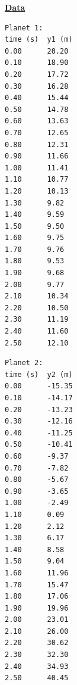 \pagebreak

\underline{\textbf{Data}} \par
\begin{multicols}{2}
\begin{verbatim}
Planet 1:
time (s)  y1 (m)
0.00      20.20
0.10      18.90
0.20      17.72
0.30      16.28
0.40      15.44
0.50      14.78
0.60      13.63
0.70      12.65
0.80      12.31
0.90      11.66
1.00      11.41
1.10      10.77
1.20      10.13
1.30      9.82
1.40      9.59
1.50      9.50
1.60      9.75
1.70      9.76
1.80      9.53
1.90      9.68
2.00      9.77
2.10      10.34
2.20      10.50
2.30      11.19
2.40      11.60
2.50      12.10
\end{verbatim}

\columnbreak

\begin{verbatim}
Planet 2:
time (s)  y2 (m)
0.00      -15.35
0.10      -14.17
0.20      -13.23
0.30      -12.16
0.40      -11.25
0.50      -10.41
0.60      -9.37
0.70      -7.82
0.80      -5.67
0.90      -3.65
1.00      -2.49
1.10      0.09
1.20      2.12
1.30      6.17
1.40      8.58
1.50      9.04
1.60      11.96
1.70      15.47
1.80      17.06
1.90      19.96
2.00      23.01
2.10      26.00
2.20      30.62
2.30      32.30
2.40      34.93
2.50      40.45
\end{verbatim}
\end{multicols}

\pagebreak \clearpage
